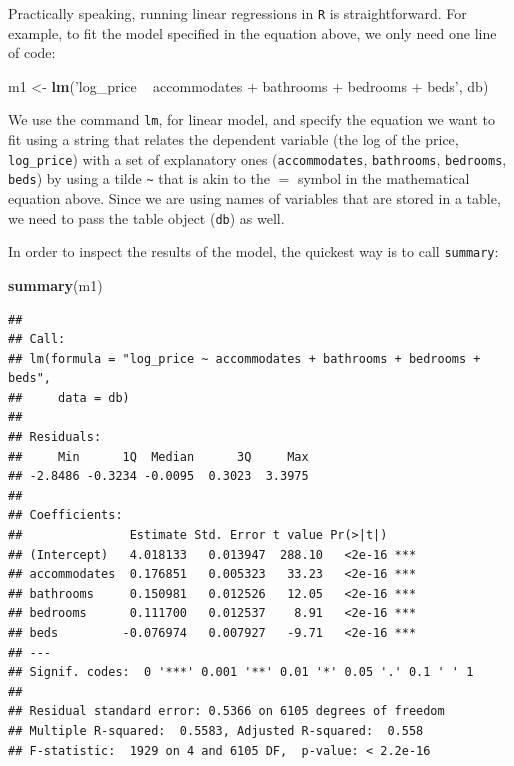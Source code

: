 \documentclass[
]{book}
\newenvironment{Shaded}{\begin{snugshade}}{\end{snugshade}}
\newcommand{\KeywordTok}[1]{\textcolor[rgb]{0.13,0.29,0.53}{\textbf{#1}}}
\newcommand{\NormalTok}[1]{#1}
\newcommand{\StringTok}[1]{\textcolor[rgb]{0.31,0.60,0.02}{#1}}
\begin{document}
Practically speaking, running linear regressions in \texttt{R} is straightforward. For example, to fit the model specified in the equation above, we only need one line of code:

\begin{Shaded}
\begin{Highlighting}[]
\NormalTok{m1 <-}\StringTok{ }\KeywordTok{lm}\NormalTok{(}\StringTok{'log_price ~ accommodates + bathrooms + bedrooms + beds'}\NormalTok{, db)}
\end{Highlighting}
\end{Shaded}

We use the command \texttt{lm}, for linear model, and specify the equation we want to fit using a string that relates the dependent variable (the log of the price, \texttt{log\_price}) with a set of explanatory ones (\texttt{accommodates}, \texttt{bathrooms}, \texttt{bedrooms}, \texttt{beds}) by using a tilde \texttt{\textasciitilde{}} that is akin to the \(=\) symbol in the mathematical equation above. Since we are using names of variables that are stored in a table, we need to pass the table object (\texttt{db}) as well.

In order to inspect the results of the model, the quickest way is to call \texttt{summary}:

\begin{Shaded}
\begin{Highlighting}[]
\KeywordTok{summary}\NormalTok{(m1)}
\end{Highlighting}
\end{Shaded}

\begin{verbatim}
## 
## Call:
## lm(formula = "log_price ~ accommodates + bathrooms + bedrooms + beds", 
##     data = db)
## 
## Residuals:
##     Min      1Q  Median      3Q     Max 
## -2.8486 -0.3234 -0.0095  0.3023  3.3975 
## 
## Coefficients:
##               Estimate Std. Error t value Pr(>|t|)    
## (Intercept)   4.018133   0.013947  288.10   <2e-16 ***
## accommodates  0.176851   0.005323   33.23   <2e-16 ***
## bathrooms     0.150981   0.012526   12.05   <2e-16 ***
## bedrooms      0.111700   0.012537    8.91   <2e-16 ***
## beds         -0.076974   0.007927   -9.71   <2e-16 ***
## ---
## Signif. codes:  0 '***' 0.001 '**' 0.01 '*' 0.05 '.' 0.1 ' ' 1
## 
## Residual standard error: 0.5366 on 6105 degrees of freedom
## Multiple R-squared:  0.5583, Adjusted R-squared:  0.558 
## F-statistic:  1929 on 4 and 6105 DF,  p-value: < 2.2e-16
\end{verbatim}
\end{document}
